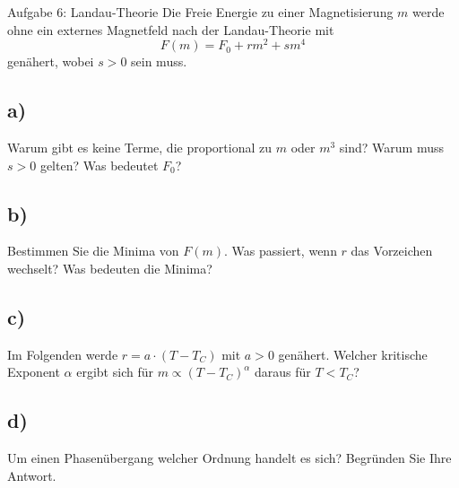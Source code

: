 \begin{aufgabe}{Aufgabe 6: Landau-Theorie}
    Die Freie Energie zu einer Magnetisierung $m$ werde ohne ein externes Magnetfeld nach der Landau-Theorie mit
    \[
        F(m) = F_0 + rm^2 + sm^4
    \]
    genähert, wobei $s > 0$ sein muss.

    \subsection{a)}
    Warum gibt es keine Terme, die proportional zu $m$ oder $m^3$ sind?
    Warum muss $s > 0$ gelten?
    Was bedeutet $F_0$?

    \subsection{b)}
    Bestimmen Sie die Minima von $F(m)$.
    Was passiert, wenn $r$ das Vorzeichen wechselt?
    Was bedeuten die Minima?

    \subsection{c)}
    Im Folgenden werde $r = a \cdot (T - T_C)$ mit $a > 0$ genähert.
    Welcher kritische Exponent $\alpha$ ergibt sich für $m \propto (T - T_C)^\alpha$ daraus für $T < T_C$?

    \subsection{d)}
    Um einen Phasenübergang welcher Ordnung handelt es sich?
    Begründen Sie Ihre Antwort.
\end{aufgabe}




